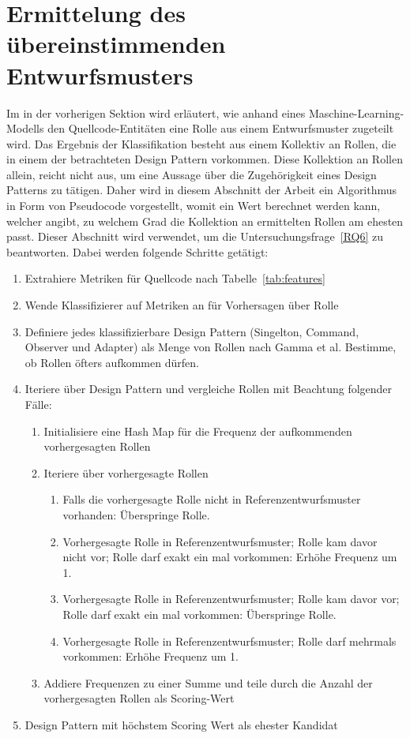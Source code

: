 \section{Ermittelung des übereinstimmenden Entwurfsmusters}\label{pattern}

Im in der vorherigen Sektion wird erläutert, wie anhand eines Maschine-Learning-Modells den Quellcode-Entitäten eine Rolle aus einem Entwurfsmuster zugeteilt wird.
Das Ergebnis der Klassifikation besteht aus einem Kollektiv an Rollen, die in einem der betrachteten Design Pattern vorkommen. Diese Kollektion an Rollen allein, reicht nicht aus, um eine Aussage über die Zugehörigkeit eines Design Patterns zu tätigen.
Daher wird in diesem Abschnitt der Arbeit ein Algorithmus in Form von Pseudocode vorgestellt, womit ein Wert berechnet werden kann, welcher angibt, zu welchem Grad die Kollektion an ermittelten Rollen am ehesten passt.
Dieser Abschnitt wird verwendet, um die Untersuchungsfrage~\ref{RQ6} zu beantworten. Dabei werden folgende Schritte getätigt:

\begin{enumerate}
    \item Extrahiere Metriken für Quellcode nach Tabelle~\ref{tab:features}
    \item Wende Klassifizierer auf Metriken an für Vorhersagen über Rolle
    \item Definiere jedes klassifizierbare Design Pattern (Singelton, Command, Observer und Adapter) als Menge von Rollen nach Gamma et al. Bestimme, ob Rollen öfters aufkommen dürfen.
    \item Iteriere über Design Pattern und vergleiche Rollen mit Beachtung folgender Fälle:
        \begin{enumerate}
            \item Initialisiere eine Hash Map für die Frequenz der aufkommenden vorhergesagten Rollen
            \item Iteriere über vorhergesagte Rollen
            \begin{enumerate}
                \item Falls die vorhergesagte Rolle nicht in Referenzentwurfsmuster vorhanden: Überspringe Rolle.
                \item Vorhergesagte Rolle in Referenzentwurfsmuster; Rolle kam davor nicht vor; Rolle darf exakt ein mal vorkommen: Erhöhe Frequenz um 1.
                \item Vorhergesagte Rolle in Referenzentwurfsmuster; Rolle kam davor vor; Rolle darf exakt ein mal vorkommen: Überspringe Rolle.
                \item Vorhergesagte Rolle in Referenzentwurfsmuster; Rolle darf mehrmals vorkommen: Erhöhe Frequenz um 1.
            \end{enumerate}
            \item Addiere Frequenzen zu einer Summe und teile durch die Anzahl der vorhergesagten Rollen als Scoring-Wert 
        \end{enumerate}    
     \item Design Pattern mit höchstem Scoring Wert als ehester Kandidat
\end{enumerate}